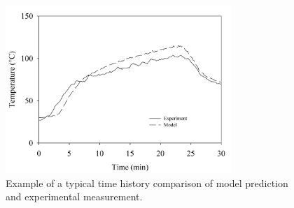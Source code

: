 \begin{figure}[ht]
\begin{center}
\includegraphics[height=2.5in]{FIGURES/sample_time_history}
\end{center}
\caption[Sample time history plots.]{Example of a typical time history comparison of model prediction and experimental measurement.}
\label{temp_history}
\end{figure}

